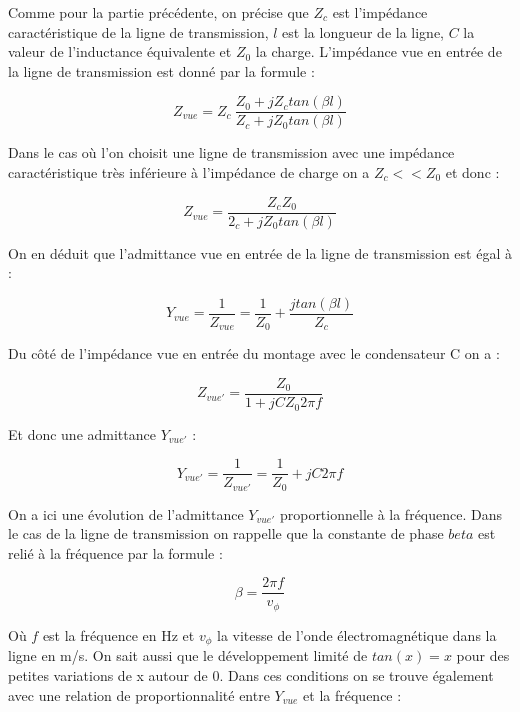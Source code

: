 \documentclass[french]{article}
\begin{document}
Comme pour la partie précédente, on précise que $Z_c$ est l’impédance caractéristique de la ligne de transmission, $l$ est la longueur de la
ligne, $C$ la valeur de l’inductance équivalente et $Z_0$ la charge. L’impédance vue en entrée de la ligne de transmission
est donné par la formule :


\begin{equation}
	Z_{vue} = Z_c\ \frac{Z_0 + j Z_c tan(\beta l)}{Z_c + j Z_0 tan(\beta l)}
\end{equation}

Dans le cas où l'on choisit une ligne de transmission avec une impédance caractéristique très inférieure à l'impédance de charge on a $Z_c<<Z_0$ et donc :

\begin{equation}
	Z_{vue} = \frac{Z_c Z_0}{2_c + j Z_0 tan(\beta l)}
\end{equation}

On en déduit que l'admittance vue en entrée de la ligne de transmission est égal à :

\begin{equation}
	Y_{vue} = \frac{1}{Z_{vue}} = \frac{1}{Z_0} + \frac{j tan(\beta l)}{Z_c}
\end{equation}

Du côté de l'impédance vue en entrée du montage avec le condensateur C on a :

\begin{equation}
	Z_{vue'} = \frac{Z_0}{1 + j C Z_0 2 \pi f}
\end{equation}


Et donc une admittance $Y_{vue'}$ :

\begin{equation}
	Y_{vue'} =  \frac{1}{Z_{vue'}} = \frac{1}{Z_0} + j C 2 \pi f
	\label{eq:YvueC1}
\end{equation}


On a ici une évolution de l'admittance $Y_{vue'}$ proportionnelle à la fréquence. Dans le cas de la ligne de transmission on rappelle que la constante de phase $beta$ est relié à la fréquence par la formule :

\begin{equation}
	\beta = \frac{2 \pi f}{v_\phi}
\end{equation}


Où $f$ est la fréquence en Hz et $v_\phi$ la vitesse de l'onde électromagnétique dans la ligne en m/s. On sait aussi que le développement limité de $tan(x)=x$ pour des petites variations de x autour de 0. Dans ces conditions on se trouve également avec une relation de proportionnalité entre $Y_{vue}$ et la fréquence :
\end{document}
